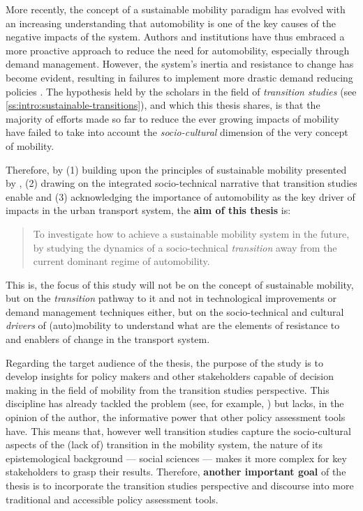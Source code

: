 More recently, the concept of a sustainable mobility paradigm has evolved with an increasing understanding that automobility is one of the key causes of the negative impacts of the system. Authors and institutions have thus embraced a more proactive approach to reduce the need for automobility, especially through demand management. However, the system's inertia and resistance to change has become evident, resulting in failures to implement more drastic demand reducing policies \parencite{geels2012_AutomobilityTransitionSocio}. The hypothesis held by the scholars in the field of \textit{transition studies} (see \autoref{ss:intro:sustainable-transitions}), and which this thesis shares, is that the majority of efforts made so far to reduce the ever growing impacts of mobility have failed to take into account the \textit{socio-cultural} dimension of the very concept of mobility.

Therefore, by (1) building upon the principles of sustainable mobility presented by \textcite{banister2008_sustainablemobilityparadigm}, (2) drawing on the integrated socio-technical narrative that transition studies enable and (3) acknowledging the importance of automobility as the key driver of impacts in the urban transport system, the \textbf{aim of this thesis} is:
\blockquote{To investigate how to achieve a sustainable mobility system in the future, by studying the dynamics of a socio-technical \textit{transition} away from the current dominant regime of automobility.}
This is, the focus of this study will not be on the concept of sustainable mobility, but on the \textit{transition} pathway to it and not in technological improvements or demand management techniques either, but on the socio-technical and cultural \textit{drivers} of (auto)mobility to understand what are the elements of resistance to and enablers of change in the transport system.

Regarding the target audience of the thesis, the purpose of the study is to develop insights for policy makers and other stakeholders capable of decision making in the field of mobility from the transition studies perspective. This discipline has already tackled the problem (see, for example, \textcite{geels2012_AutomobilityTransitionSocio}) but lacks, in the opinion of the author, the informative power that other policy assessment tools have. This means that, however well transition studies capture the socio-cultural aspects of the (lack of) transition in the mobility system, the nature of its epistemological background --- social sciences --- makes it more complex for key stakeholders to grasp their results. Therefore, \textbf{another important goal} of the thesis is to incorporate the transition studies perspective and discourse into more traditional and accessible policy assessment tools.

